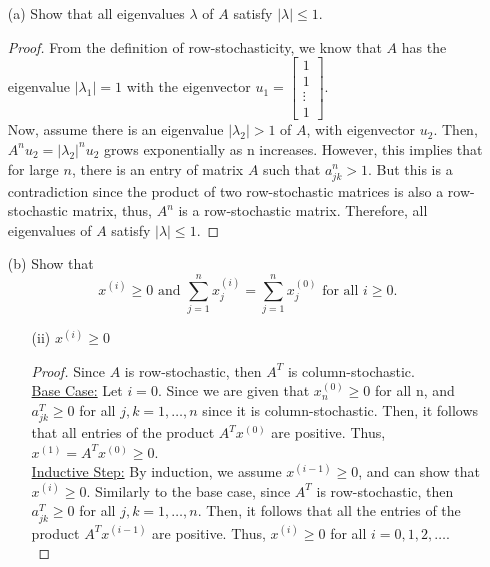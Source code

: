 \documentclass[12pt]{article}
\begin{document}
\begin{itemize}

\item[(a)] Show that all eigenvalues $\lambda$ of $A$ satisfy $|\lambda| \leq 1$.\\

\begin{proof} From the definition of row-stochasticity, we know that $A$ has the eigenvalue $|\lambda_1| = 1$ with the eigenvector 
$u_1 = \begin{bmatrix}
		1 \\
		1 \\
		\vdots \\
		1
		\end{bmatrix}$.\\

Now, assume there is an eigenvalue $|\lambda_2| > 1$ of $A$, with eigenvector $u_2$.  Then, $A^n u_2 = |\lambda_2|^n u_2$ grows exponentially as n increases.  However, this implies that for large $n$, there is an entry of matrix $A$ such that $a_{jk}^n > 1$.  But this is a contradiction since the product of two row-stochastic matrices is also a row-stochastic matrix, thus, $A^n$ is a row-stochastic matrix.  Therefore, all eigenvalues of $A$ satisfy $|\lambda| \leq 1$.



\end{proof}

\item[(b)] Show that
$$x^{(i)} \geq 0 \text{ and } \sum_{j=1}^n x_j^{(i)} = \sum_{j=1}^n x_j^{(0)} \text{ for all } i \geq 0.$$

\begin{itemize}
\item[(ii)] $x^{(i)} \geq 0$\\
\begin{proof} Since $A$ is row-stochastic, then $A^T$ is column-stochastic.\\

\underline{Base Case:}  Let $i = 0$.  Since we are given that $x_n^{(0)} \geq 0$ for all n, and $a^T_{jk} \geq 0$ for all $j,k = 1, \dots , n$ since it is column-stochastic.  Then, it follows that all entries of the product $A^T x^{(0)}$ are positive.  Thus, $x^{(1)} = A^T x^{(0)} \geq 0$.\\

\underline{Inductive Step:} By induction, we assume $x^{(i-1)} \geq 0$, and can show that $x^{(i)} \geq 0$.  Similarly to the base case, since $A^T$ is row-stochastic, then $a^T_{jk} \geq 0$ for all $j,k = 1, \dots , n$.  Then, it follows that all the entries of the product $A^T x^{(i-1)}$ are positive.  Thus, $x^{(i)} \geq 0$ for all $i=0,1,2, \dots$.\\


\end{proof}
\end{itemize}
\end{itemize}
\end{document}

